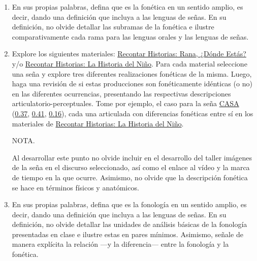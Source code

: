 
\begin{enumerate}[leftmargin=*, itemsep=12pt]

\item En sus propias palabras, defina que es la fonética en un sentido amplio, es decir, dando una definición que incluya a las lenguas de señas. En su definición, no olvide detallar las subramas de la fonética e ilustre comparativamente cada rama para las lenguas orales y las lenguas de señas.

\item Explore los siguientes materiales: \href{https://www.youtube.com/playlist?list=PLh1FSFqMn5hATtH\_meS1I8qM8H9pJwpr2}{Recontar Historias: Rana, ¿Dónde Estás?} y/o \href{https://www.youtube.com/playlist?list=PLh1FSFqMn5hDMJ5356GeYGkuy7-ucvV8j}{Recontar Historias: La Historia del Niño}. Para cada material seleccione una seña y explore tres diferentes realizaciones fonéticas de la misma. Luego, haga una revisión de si estas producciones son fonéticamente idénticas (o no) en las diferentes ocurrencias, presentando las respectivas descripciones articulatorio-perceptuales. Tome por ejemplo, el caso para la seña \href{https://drive.google.com/file/d/1B1Z5tOB7Jnn7iWsXKE9Xr1jVaF9wBkFd/view?usp=sharing}{CASA} (\href{https://www.youtube.com/watch?t=37\&v=Lhv2ZGsdzrM}{0.37}, \href{https://www.youtube.com/watch?t=41\&v=izfaNu3DkNg}{0.41}, \href{https://www.youtube.com/watch?t=16\&v=vWmA1u4-N5o}{0.16}), cada una articulada con diferencias fonéticas entre sí en los materiales de \href{https://www.youtube.com/playlist?list=PLh1FSFqMn5hDMJ5356GeYGkuy7-ucvV8j}{Recontar Historias: La Historia del Niño}.


NOTA.



Al desarrollar este punto no olvide incluir en el desarrollo del taller imágenes de la seña en el discurso seleccionado, así como el enlace al vídeo y la marca de tiempo en la que ocurre. Asimismo, no olvide que la descripción fonética se hace en términos físicos y anatómicos.


\item En sus propias palabras, defina que es la fonología en un sentido amplio, es decir, dando una definición que incluya a las lenguas de señas. En su definición, no olvide detallar las unidades de análisis básicas de la fonología presentadas en clase e ilustre estas en pares mínimos. Asimismo, señale de manera explícita la relación —y la diferencia— entre la fonología y la fonética.


\end{enumerate}
